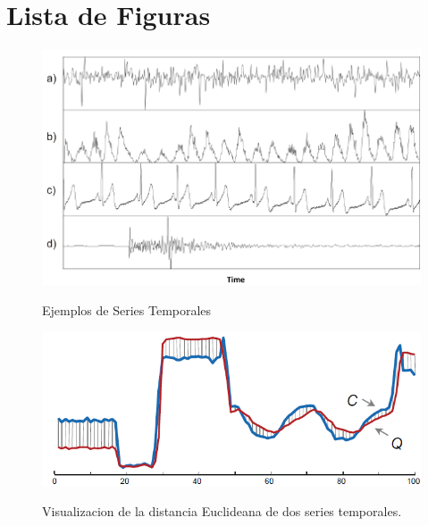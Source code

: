\section{Lista de Figuras}
\begin{figure}[h]
\vspace{0.1in}
\begin{center}
\includegraphics[scale=0.6]{timeSeries.png}\\%
\end{center}
\caption{Ejemplos de Series Temporales}
\label{arm:fig1}
\end{figure}
\begin{figure}[h]
\vspace{0.1in}
\begin{center}
\includegraphics[scale=0.6]{euclidean.png}\\
\end{center}
\caption{Visualizacion de la distancia Euclideana de dos series temporales.}
\label{arm:fig1}
\end{figure}
